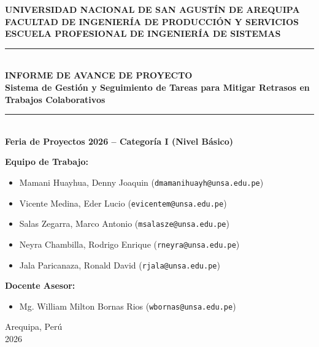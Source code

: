 \documentclass[11pt,a4paper]{article}
\begin{document}
\begin{titlepage}
    \centering
    \vspace*{0.5cm}
    {\Large \textbf{UNIVERSIDAD NACIONAL DE SAN AGUSTÍN DE AREQUIPA}}\\[0.3cm]
    {\large \textbf{FACULTAD DE INGENIERÍA DE PRODUCCIÓN Y SERVICIOS}}\\[0.3cm]
    {\large \textbf{ESCUELA PROFESIONAL DE INGENIERÍA DE SISTEMAS}}\\[1.5cm]

    \rule{\linewidth}{0.5mm}\\[0.4cm]
    {\LARGE \textbf{INFORME DE AVANCE DE PROYECTO}}\\[0.3cm]
    {\large \textbf{Sistema de Gestión y Seguimiento de Tareas para Mitigar Retrasos en Trabajos Colaborativos}}\\[0.2cm]
    \rule{\linewidth}{0.5mm}\\[1.2cm]

    \textbf{Feria de Proyectos 2026 -- Categoría I (Nivel Básico)}\\[1.5cm]

    \begin{minipage}{0.85\textwidth}
        \textbf{Equipo de Trabajo:}
        \begin{itemize}[leftmargin=*,itemsep=0.15cm]
            \item Mamani Huayhua, Denny Joaquin (\texttt{dmamanihuayh@unsa.edu.pe})
            \item Vicente Medina, Eder Lucio (\texttt{evicentem@unsa.edu.pe})
            \item Salas Zegarra, Marco Antonio (\texttt{msalasze@unsa.edu.pe})
            \item Neyra Chambilla, Rodrigo Enrique (\texttt{rneyra@unsa.edu.pe})
            \item Jala Paricanaza, Ronald David (\texttt{rjala@unsa.edu.pe})
        \end{itemize}
        \vspace{0.4cm}
        \textbf{Docente Asesor:}
        \begin{itemize}[leftmargin=*,itemsep=0.15cm]
            \item Mg. William Milton Bornas Rios (\texttt{wbornas@unsa.edu.pe})
        \end{itemize}
    \end{minipage}

    \vfill
    {\large Arequipa, Perú\\ 2026}
\end{titlepage}
\end{document}
